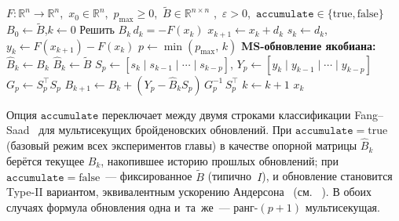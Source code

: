 \begin{breakablealgorithm}
\caption{Мультисекущий Бройден
         $(F,\,x_0,\,p_{\max},\,\widetilde{B},\,\varepsilon,\,\mathtt{accumulate})$}
\label{alg:sp_broyden}
\begin{algorithmic}
\Require $F\colon \mathbb{R}^n \to \mathbb{R}^n$,\ $x_0 \in \mathbb{R}^n$,\
         $p_{\max} \geq 0$,\
         $\widetilde{B} \in \mathbb{R}^{n \times n}$
         ,\
         $\varepsilon > 0$,\
         $\mathtt{accumulate} \in \{\text{true},\text{false}\}$
\State $B_0 \leftarrow \widetilde{B}$,\quad $k \leftarrow 0$
\While{$\|F(x_k)\| \geq \varepsilon$}
  \State Решить $B_k\,d_k = -F(x_k)$
  \State $x_{k+1} \leftarrow x_k + d_k$
  \State $s_k \leftarrow d_k$,\quad $y_k \leftarrow F(x_{k+1}) - F(x_k)$
  \State $p \leftarrow \min(p_{\max},\,k)$
  \State \textbf{MS-обновление якобиана:}
  \If{$\mathtt{accumulate}$}
    \State $\widehat{B}_k \leftarrow B_k$
  \Else
    \State $\widehat{B}_k \leftarrow \widetilde{B}$
  \EndIf
  \State $S_p \leftarrow [s_k \mid s_{k-1} \mid \cdots \mid s_{k-p}]$,\quad
         $Y_p \leftarrow [y_k \mid y_{k-1} \mid \cdots \mid y_{k-p}]$
  \State $G_p \leftarrow S_p^\top S_p$
       \hfill{}
  \State $B_{k+1} \leftarrow \widehat{B}_k +
    (Y_p - \widehat{B}_k S_p)\,G_p^{-1}\,S_p^\top$
       \hfill{}
  \State $k \leftarrow k + 1$
\EndWhile
\Return $x_k$
\end{algorithmic}
\end{breakablealgorithm}

\begin{remark}\label{rem:taxonomy}
Опция $\mathtt{accumulate}$ переключает между двумя строками
классификации Fang--Saad~\cite{fang2009} для мультисекущих
бройденовских обновлений. При $\mathtt{accumulate}=\text{true}$
(базовый режим всех экспериментов главы) в качестве опорной матрицы
$\widehat B_k$ берётся текущее $B_k$, накопившее историю прошлых
обновлений; при $\mathtt{accumulate}=\text{false}$~--- фиксированное
$\widetilde B$ (типично~$I$), и обновление становится Type-II
вариантом, эквивалентным ускорению Андерсона~\cite{anderson1965}
(см. ~\cite{fang2009}). В обоих случаях формула
обновления одна и~та~же~--- ранг-$(p{+}1)$ мультисекущая.
\end{remark}

